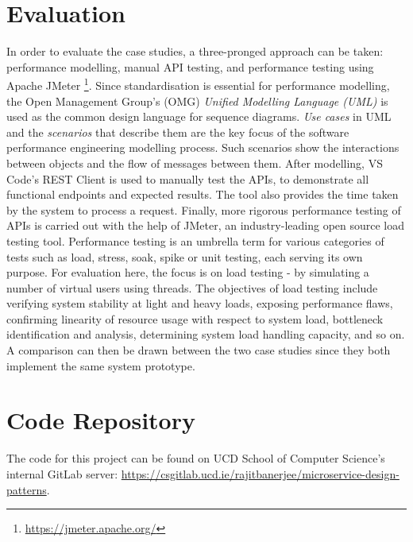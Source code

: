\section{Evaluation}

In order to evaluate the case studies, a three-pronged approach can be taken: performance modelling, manual API testing, and performance testing using Apache JMeter \footnote{\url{https://jmeter.apache.org/}}. Since standardisation is essential for performance modelling, the Open Management Group's (OMG) \textit{Unified Modelling Language (UML)} is used as the common design language for sequence diagrams. \textit{Use cases} in UML and the \textit{scenarios} that describe them are the key focus of the software performance engineering modelling process. Such scenarios show the interactions between objects and the flow of messages between them. After modelling, VS Code's REST Client is used to manually test the APIs, to demonstrate all functional endpoints and expected results. The tool also provides the time taken by the system to process a request. Finally, more rigorous performance testing of APIs is carried out with the help of JMeter, an industry-leading open source load testing tool. Performance testing is an umbrella term for various categories of tests such as load, stress, soak, spike or unit testing, each serving its own purpose. For evaluation here, the focus is on load testing - by simulating a number of virtual users using threads. The objectives of load testing include verifying system stability at light and heavy loads, exposing performance flaws, confirming linearity of resource usage with respect to system load, bottleneck identification and analysis, determining system load handling capacity, and so on. A comparison can then be drawn between the two case studies since they both implement the same system prototype.

\section{Code Repository}

The code for this project can be found on UCD School of Computer Science's internal GitLab server: \url{https://csgitlab.ucd.ie/rajitbanerjee/microservice-design-patterns}.
